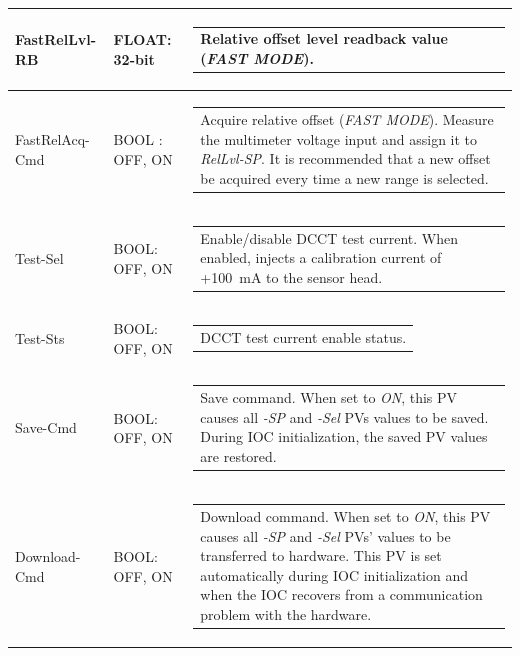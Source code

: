 \documentclass[openany]{article}
\begin{document}
\begin{longtable}{| m{3.0cm} m{4.5cm} m{7.0cm} |}
		FastRelLvl-RB & FLOAT: 32-bit & \begin{tabular}{@{}m{6cm}@{}}
	    					Relative offset level readback value (\emph{FAST MODE}).
						\end{tabular} \\ \hline
		FastRelAcq-Cmd & BOOL : OFF, ON & \begin{tabular}{@{}m{6cm}@{}}
						Acquire relative offset (\emph{FAST MODE}). Measure the multimeter voltage input and assign it to \emph{RelLvl-SP}. It is recommended that a new offset be acquired every time a new range is selected.
						\end{tabular} \\ \hline
		Test-Sel & BOOL: OFF, ON & \begin{tabular}{@{}m{6cm}@{}}
	    					Enable/disable DCCT test current. When enabled, injects a calibration current of +\SI{100}{\milli\ampere} to the sensor head.
						\end{tabular} \\ \hline
		Test-Sts & BOOL: OFF, ON & \begin{tabular}{@{}m{6cm}@{}}
 						DCCT test current enable status.
						\end{tabular} \\ \hline
		Save-Cmd & BOOL: OFF, ON & \begin{tabular}{@{}m{6cm}@{}}
 						Save command. When set to \emph{ON}, this PV causes all \emph{-SP} and \emph{-Sel} PVs values to be saved. During IOC initialization, the saved PV values are restored.
						\end{tabular} \\ \hline
		Download-Cmd & BOOL: OFF, ON & \begin{tabular}{@{}m{6cm}@{}}
 						Download command. When set to \emph{ON}, this PV causes all \emph{-SP} and \emph{-Sel} PVs' values to be transferred to hardware. This PV is set automatically during IOC initialization and when the IOC recovers from a communication problem with the hardware.
						\end{tabular} \\ \hline
	\end{longtable}
\end{document}
